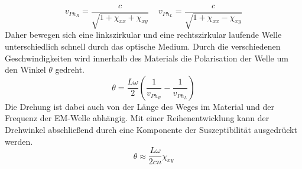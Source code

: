 \begin{equation}
    v_{Ph_{R}} = \frac{c}{\sqrt{1+\chi_{xx} +\chi_{xy}}}  \; \; \; \;  v_{Ph_{L}} = \frac{c}{\sqrt{1+\chi_{xx} -\chi_{xy}}} 
\end{equation}
Daher bewegen sich eine linkszirkular und eine rechtszirkular laufende Welle unterschiedlich schnell durch das optische Medium.
Durch die verschiedenen Geschwindigkeiten wird innerhalb des Materials die Polarisation der Welle um den Winkel $\theta$ gedreht.
\begin{equation}
    \theta = \frac{L\omega}{2} \left( \frac{1}{v_{Ph_{R}}} - \frac{1}{v_{Ph_{L}}} \right)
\end{equation}
Die Drehung ist dabei auch von der Länge des Weges im Material und der Frequenz der EM-Welle abhängig.
Mit einer Reihenentwicklung kann der Drehwinkel abschließend durch eine Komponente der Suszeptibilität ausgedrückt werden.
\begin{equation}
    \theta \approx  \frac{L\omega}{2cn} \chi_{xy}
    \label{eqn:theta}
\end{equation}

